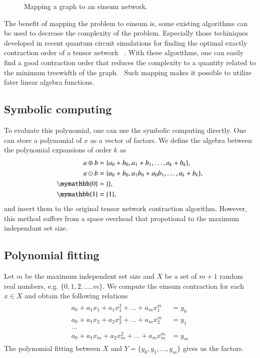 \documentclass{article}
\newcommand{\<}{\langle}
\renewcommand{\>}{\rangle}
\renewcommand{\cite}[1]{{\citep{#1}}}
\theoremstyle{definition}\newtheorem{definition}{\textit{Definition}}
\begin{document}
\begin{figure}[t!]
\begin{subfigure}[t]{0.4\textwidth}
        \caption{}
    \end{subfigure}
    \caption{Mapping a graph to an einsum network.}\label{fig:einsummapping}
\end{figure}
The benefit of mapping the problem to einsum is, some existing algorithms can be used to decrease the complexity of the problem.
Especially those techiniques developed in recent quantum circuit simulations for finding the optimal exactly contraction order of a tensor network ~\cite{Gray2021,Pan2021}.
With these algorithms, one can easily find a good contraction order that reduces the complexity to a quantity related to the minimum treewidth of the graph.~\cite{Markov2008}
Such mapping makes it possible to utilize fater linear algebra functions.

\subsection{Symbolic computing}
To evaluate this polynomial, one can use the symbolic computing directly.
One can store a polynomial of $x$ as a vector of factors.
We define the algebra between the polynomial expansions of order $k$ as
\begin{align}
    \begin{split}
    a \oplus b &= \{a_0 + b_0, a_1 + b_1, \ldots, a_k + b_k\},\\
    a \odot b &= \{a_0 + b_0, a_1b_0 + a_0b_1, \ldots, a_k + b_k\},\\
    \mymathbb{0} &= \{\},\\
    \mymathbb{1} &= \{1\},
    \end{split}
\end{align}
and insert them to the original tensor network contraction algorithm.
However, this method suffers from a space overhead that propotional to the maximum independant set size.

\subsection{Polynomial fitting}
Let $m$ be the maximum independent set size and $X$ be a set of $m+1$ random real numbers, e.g. $\{0, 1, 2, \ldots, m\}$.
We compute the einsum contraction for each $x \in X$ and obtain the following relations
\begin{align}
    \begin{split}
a_0 + a_1 x_1 + a_1 x_1^2 + \ldots + a_m x_1^m &= y_0\\
a_0 + a_1 x_2 + a_2 x_2^2 + \ldots + a_m x_2^m &= y_1\\
\ldots&\\
a_0 + a_1 x_m + a_2 x_m^2 + \ldots + a_m x_m^m& = y_m
    \end{split}
\end{align}
The polynomial fitting between $X$ and $Y = \{y_0, y_1, \ldots, y_m\}$ gives us the factors.
\end{document}
